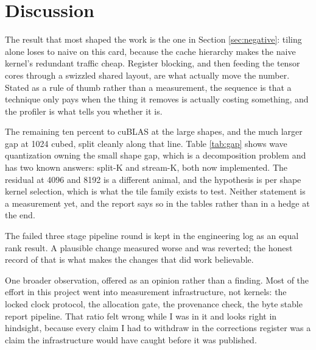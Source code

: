 \section{Discussion}

The result that most shaped the work is the one in Section \ref{sec:negative}:
tiling alone loses to naive on this card, because the cache hierarchy makes the
naive kernel's redundant traffic cheap. Register blocking, and then feeding the
tensor cores through a swizzled shared layout, are what actually move the number.
Stated as a rule of thumb rather than a measurement, the sequence is that a
technique only pays when the thing it removes is actually costing something, and
the profiler is what tells you whether it is.

The remaining ten percent to cuBLAS at the large shapes, and the much larger gap at
1024 cubed, split cleanly along that line. Table \ref{tab:gap} shows wave
quantization owning the small shape gap, which is a decomposition problem and has
two known answers: split-K and stream-K, both now implemented. The residual at 4096
and 8192 is a different animal, and the hypothesis is per shape kernel selection,
which is what the tile family exists to test. Neither statement is a measurement
yet, and the report says so in the tables rather than in a hedge at the end.

The failed three stage pipeline round is kept in the engineering log as an equal
rank result. A plausible change measured worse and was reverted; the honest record
of that is what makes the changes that did work believable.

One broader observation, offered as an opinion rather than a finding. Most of the
effort in this project went into measurement infrastructure, not kernels: the
locked clock protocol, the allocation gate, the provenance check, the byte stable
report pipeline. That ratio felt wrong while I was in it and looks right in
hindsight, because every claim I had to withdraw in the corrections register was a
claim the infrastructure would have caught before it was published.
